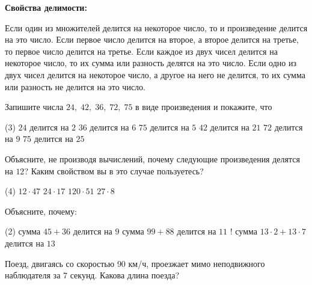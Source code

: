 \begin{class}[number=6]
	\begin{listofex}
	\item \textbf{Свойства делимости:}
	\begin{tasks}
		\task Если один из множителей делится на некоторое число, то и произведение делится на это число.
		\task Если первое число делится на второе, а второе делится на третье, то первое число делится на третье.
		\task Если каждое из двух чисел делится на некоторое число, то их сумма или разность делятся на это число.
		\task Если одно из двух чисел делится на некоторое число, а другое на него не делится, то их сумма или разность не делится на это число.
	\end{tasks}
	\item Запишите числа \( 24,\;42,\;36,\;72,\;75 \) в виде произведения и покажите, что
	\begin{tasks}(3)
		\task \( 24 \) делится на \( 2 \)
		\task \( 36 \) делится на \( 6 \)
		\task \( 75 \) делится на \( 5 \)
		\task \( 42 \) делится на \( 21 \)
		\task \( 72 \) делится на \( 9 \)
		\task \( 75 \) делится на \( 25 \)
	\end{tasks}
	\item Объясните, не производя вычислений, почему следующие произведения делятся на \( 12 \)? Каким свойством вы в это случае пользуетесь?
	\begin{tasks}(4)
		\task \( 12\cdot47 \)
		\task \( 24\cdot17 \)
		\task \( 120\cdot51 \)
		\task \( 27\cdot8 \)
	\end{tasks}
	\item Объясните, почему:
	\begin{tasks}(2)
		\task сумма \( 45+36 \) делится на \( 9 \)
		\task сумма \( 99+88 \) делится на \( 11 \)
		\task! сумма \( 13\cdot2+13\cdot7\) делится на \( 13 \)
	\end{tasks}
	\item Поезд, двигаясь со скоростью \( 90 \) км/ч, проезжает мимо неподвижного наблюдателя за \( 7 \) секунд. Какова длина поезда?
	\end{listofex}
\end{class}


